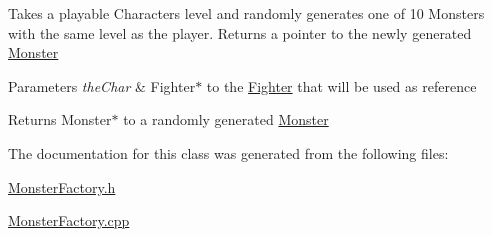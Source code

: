 Takes a playable Character\textquotesingle{}s level and randomly generates one of 10 Monsters with the same level as the player. Returns a pointer to the newly generated \hyperlink{class_monster}{Monster} 
\begin{DoxyParams}{Parameters}
{\em the\+Char} & Fighter$\ast$ to the \hyperlink{class_fighter}{Fighter} that will be used as reference \\
\hline
\end{DoxyParams}
\begin{DoxyReturn}{Returns}
Monster$\ast$ to a randomly generated \hyperlink{class_monster}{Monster} 
\end{DoxyReturn}


The documentation for this class was generated from the following files\+:\begin{DoxyCompactItemize}
\item 
\hyperlink{_monster_factory_8h}{Monster\+Factory.\+h}\item 
\hyperlink{_monster_factory_8cpp}{Monster\+Factory.\+cpp}\end{DoxyCompactItemize}
